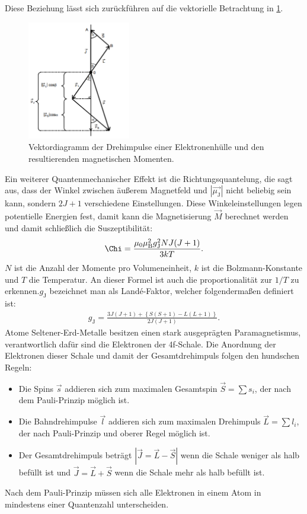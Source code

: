 Diese Beziehung lässt sich zurückführen auf die vektorielle Betrachtung
in \ref{fig:winkel}.
\begin{figure}
 \centering
 \includegraphics[width=0.4\textwidth]{winkel.png}
 \caption{Vektordiagramm der Drehimpulse einer Elektronenhülle und den resultierenden magnetischen Momenten. }
 \label{fig:winkel}
 \end{figure}

Ein weiterer Quantenmechanischer Effekt ist die Richtungsquantelung,
die sagt aus, dass der Winkel zwischen äußerem Magnetfeld und
$|\vec{\mu_\mathrm{J}}|$  nicht beliebig sein kann, sondern $2J+1$
verschiedene Einstellungen. Diese Winkeleinstellungen legen potentielle Energien fest,
damit kann die Magnetisierung $\vec{M}$ berechnet werden und damit schließlich
die Suszeptibilität:
\begin{align}
  \Chi=\frac{\mu_0\mu_\mathrm{B}^2g_\mathrm{J}^2NJ(J+1)}{3kT}.
\end{align}
$N$ ist die Anzahl der Momente pro Volumeneinheit, $k$ ist die Bolzmann-Konstante und
$T$ die Temperatur. An dieser Formel ist auch die proportionalität zur $1/T$
zu erkennen.$g_\mathrm{J}$ bezeichnet man als Landé-Faktor, welcher folgendermaßen definiert ist:
\begin{align}
  g_\mathrm{J}=\frac{3J(J+1)+\left\{S(S+1)-L(L+1)\right\}}{2J(J+1)}.
\end{align}
Atome Seltener-Erd-Metalle besitzen einen stark ausgeprägten Paramagnetismus,
verantwortlich dafür sind die Elektronen der 4f-Schale. Die Anordnung der Elektronen dieser
Schale und damit der Gesamtdrehimpuls folgen den hundschen Regeln:
\begin{itemize}
  \item Die Spins $\vec{s}$ addieren sich zum maximalen Gesamtspin
   $\vec{S}=\sum s_i$, der nach dem Pauli-Prinzip möglich ist.
   \item Die Bahndrehimpulse $\vec{l}$ addieren sich zum maximalen Drehimpuls
   $\vec{L}=\sum l_i$, der nach Pauli-Prinzip und oberer Regel möglich ist.
   \item Der Gesamtdrehimpuls beträgt $|\vec{J}=\vec{L}-\vec{S}|$ wenn die
   Schale weniger als halb befüllt ist und $\vec{J}=\vec{L}+\vec{S}$ wenn die
   Schale mehr als halb befüllt ist.
\end{itemize}
Nach dem Pauli-Prinzip müssen sich alle Elektronen in einem Atom in mindestens 
einer Quantenzahl unterscheiden.
